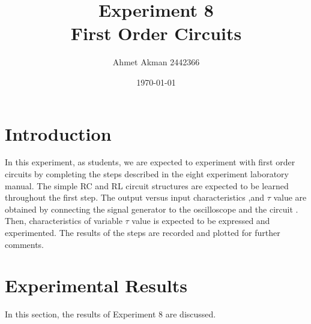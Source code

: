 \documentclass[letterpaper,12pt]{article}
\begin{document}
\title{Experiment 8 \protect\\First Order Circuits}
\author{Ahmet Akman 2442366 }
\date{\today}
\maketitle
\newpage
\tableofcontents
\newpage

\section{Introduction} 
In this experiment, as students, we are expected to experiment with first order circuits by completing the steps described in the eight experiment laboratory manual. The simple RC and RL circuit structures are expected to be learned throughout the first step. The output versus input characteristics ,and \(\tau\) value are obtained by connecting the signal generator to the oscilloscope and the circuit . Then, characteristics of variable \(\tau\) value is expected to be expressed and experimented. The results of the steps are recorded and plotted for further comments.
\section{Experimental Results}
In this section, the results of Experiment 8 are discussed. 
\end{document}
